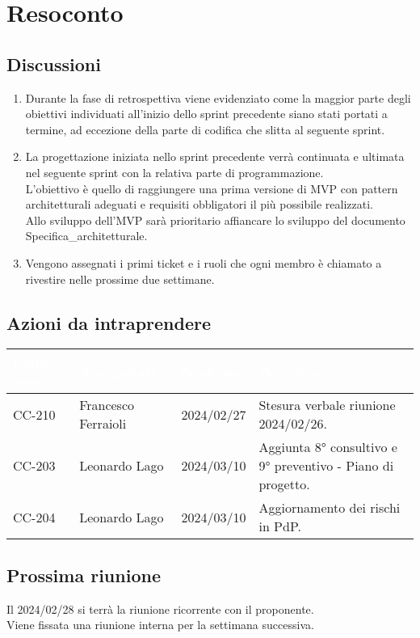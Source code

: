 \section{Resoconto} \label{sec:resoconto}
\subsection{Discussioni} \label{subsec:resdiscussione}
\begin{enumerate}
    \item Durante la fase di retrospettiva viene evidenziato come la maggior parte degli obiettivi individuati all'inizio dello sprint precedente siano stati portati a termine, ad eccezione della parte di codifica che slitta al seguente sprint. 
    
    \item La progettazione iniziata nello sprint precedente verrà continuata e ultimata nel seguente sprint con la relativa parte di programmazione. \\
    L'obiettivo è quello di raggiungere una prima versione di MVP con pattern architetturali adeguati e requisiti obbligatori il più possibile realizzati. \\
    Allo sviluppo dell'MVP sarà prioritario affiancare lo sviluppo del documento Specifica\_architetturale.
    
    \item Vengono assegnati i primi ticket e i ruoli che ogni membro è chiamato a rivestire nelle prossime due settimane.
\end{enumerate}

\subsection{Azioni da intraprendere}
{
    \setlength{\tabcolsep}{10pt}
            \renewcommand{\arraystretch}{1.5}
            \begin{xltabular}{\textwidth}{| l | l | l | X |}
                 \hline
                 \textbf{\textcolor{white}{Codice issue}} & \textbf{\textcolor{white}{Assegnatario}} & \textbf{\textcolor{white}{Scadenza}} & \textbf{\textcolor{white}{Descrizione}} \\
                 \hline
                 CC-210 & Francesco Ferraioli & 2024/02/27 & Stesura verbale riunione 2024/02/26.\\
                 \hline
                 CC-203 & Leonardo Lago & 2024/03/10 & Aggiunta 8° consultivo e 9° preventivo - Piano di progetto.\\
                 \hline
                 CC-204 & Leonardo Lago & 2024/03/10 & Aggiornamento dei rischi in PdP.\\
                 \hline
                 
            \end{xltabular}
}

\subsection{Prossima riunione} \label{subsec:riunione}
Il 2024/02/28 si terrà la riunione ricorrente con il proponente. \\ 
Viene fissata una riunione interna per la settimana successiva.
